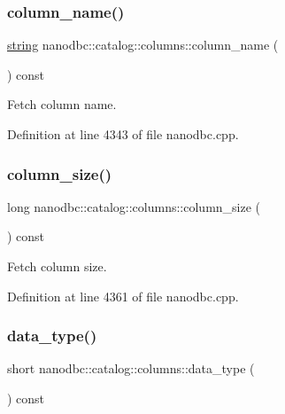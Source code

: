 \subsubsection{\texorpdfstring{column\_name()}{column\_name()}}
{\footnotesize\ttfamily \mbox{\hyperlink{namespacenanodbc_abfc0ece56278e590911ec8352774c212}{string}} nanodbc\+::catalog\+::columns\+::column\+\_\+name (\begin{DoxyParamCaption}{ }\end{DoxyParamCaption}) const}



Fetch column name. 



Definition at line 4343 of file nanodbc.\+cpp.

\mbox{\label{classnanodbc_1_1catalog_1_1columns_abf0f652057e62610bce32fedd4039831}} 
\subsubsection{\texorpdfstring{column\_size()}{column\_size()}}
{\footnotesize\ttfamily long nanodbc\+::catalog\+::columns\+::column\+\_\+size (\begin{DoxyParamCaption}{ }\end{DoxyParamCaption}) const}



Fetch column size. 



Definition at line 4361 of file nanodbc.\+cpp.

\mbox{\label{classnanodbc_1_1catalog_1_1columns_afc61c619375282c2777ecc79f6a47cd0}} 
\subsubsection{\texorpdfstring{data\_type()}{data\_type()}}
{\footnotesize\ttfamily short nanodbc\+::catalog\+::columns\+::data\+\_\+type (\begin{DoxyParamCaption}{ }\end{DoxyParamCaption}) const}



